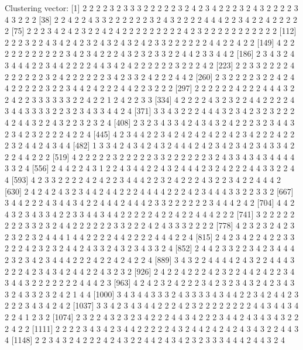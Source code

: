 \begin{Schunk}
\begin{Soutput}
Clustering vector:
   [1] 2 2 2 2 3 2 3 3 3 2 2 2 2 2 3 2 4 2 3 4 2 2 2 3 2 4 3 2 2 2 2 3 4 3 2 2 2
  [38] 2 2 4 2 2 4 3 3 2 2 2 2 2 2 3 2 4 3 2 2 2 2 4 4 4 2 2 3 4 2 2 4 2 2 2 2 2
  [75] 2 2 2 3 4 2 4 2 3 2 2 4 2 4 2 2 2 2 2 2 2 2 2 4 2 3 2 2 2 2 2 2 2 2 2 2 2
 [112] 2 2 2 3 2 2 4 3 4 2 4 2 3 2 4 3 2 4 3 2 4 2 3 3 2 2 2 2 2 2 4 4 2 2 4 2 2
 [149] 4 2 2 2 2 2 2 2 2 2 2 2 3 4 2 3 4 2 2 2 4 3 2 3 2 3 3 2 2 4 4 2 3 3 4 4 2
 [186] 2 3 4 3 2 4 3 4 4 4 2 2 3 4 4 2 2 2 2 4 4 3 4 2 4 2 2 2 2 2 2 3 2 2 2 4 2
 [223] 2 2 3 3 2 2 2 2 4 2 2 2 2 2 2 3 2 4 2 2 2 2 2 2 3 4 2 3 3 2 4 2 2 2 4 4 2
 [260] 2 3 2 2 2 2 3 2 2 4 2 4 4 2 2 2 2 2 3 2 2 3 4 4 2 4 2 2 2 4 4 2 2 3 2 2 2
 [297] 2 2 2 2 2 2 4 2 2 2 4 4 4 3 2 2 4 2 2 3 3 3 3 3 3 2 2 4 2 2 1 2 4 2 2 3 3
 [334] 4 2 2 2 2 4 3 2 3 2 2 4 4 2 2 2 2 4 3 4 4 3 3 3 3 2 2 3 2 3 4 3 3 4 4 2 4
 [371] 3 3 4 3 2 2 2 4 4 4 3 2 3 4 2 3 2 3 2 2 2 4 2 4 4 3 2 2 4 3 2 2 3 2 3 2 4
 [408] 2 3 2 3 4 3 3 4 2 4 3 4 3 2 4 2 2 2 3 2 3 4 4 3 2 3 4 2 3 2 2 2 2 4 2 2 4
 [445] 4 2 3 4 4 2 2 3 4 2 4 2 4 2 4 2 2 4 2 3 4 2 2 2 4 2 2 2 3 2 4 4 2 4 3 4 4
 [482] 1 3 3 4 2 4 3 4 2 4 3 2 4 4 4 2 4 2 3 4 2 3 4 2 3 4 3 3 4 2 2 2 4 4 2 2 2
 [519] 4 2 2 2 2 2 3 2 2 2 2 2 3 3 2 2 2 2 2 2 3 2 4 3 3 4 3 4 3 4 4 4 4 3 3 2 4
 [556] 2 4 4 2 2 4 3 1 2 2 4 3 4 4 2 2 4 3 2 4 4 4 2 3 2 4 2 2 2 4 4 3 3 2 2 4 4
 [593] 4 2 3 3 2 2 2 2 4 2 4 2 2 3 4 4 4 2 2 3 2 4 2 2 2 4 3 2 2 3 4 2 2 4 4 4 2
 [630] 2 4 2 4 2 4 3 2 3 4 4 2 4 4 2 2 2 4 4 4 4 2 2 2 4 2 3 4 4 4 3 3 2 2 3 3 2
 [667] 3 4 4 2 2 2 4 3 4 4 3 4 2 2 4 4 4 2 4 4 4 2 3 3 2 2 2 2 2 2 3 4 4 4 2 4 2
 [704] 4 4 2 4 3 2 3 4 3 3 4 2 2 3 3 4 4 3 4 4 2 2 2 2 2 4 2 2 4 2 2 4 4 4 2 2 2
 [741] 3 2 2 2 2 2 2 2 2 3 3 2 3 2 4 4 2 2 2 2 2 2 3 3 2 2 2 4 2 4 3 3 3 2 2 2 2
 [778] 4 2 3 2 3 2 4 2 3 2 3 2 2 3 2 4 4 4 1 4 4 2 2 2 2 4 4 2 2 2 2 4 4 4 2 2 4
 [815] 2 4 2 3 4 2 2 4 2 2 3 3 2 2 2 4 2 3 2 3 2 4 4 2 4 3 3 2 4 3 2 3 4 3 3 2 4
 [852] 2 4 4 2 3 3 2 2 3 4 2 3 4 4 4 2 3 2 3 4 2 3 4 4 4 2 2 2 4 2 2 4 2 4 2 2 4
 [889] 3 4 3 2 2 4 4 4 4 2 4 3 2 2 4 4 4 3 2 2 2 4 2 3 4 3 4 2 4 4 2 2 4 3 2 3 2
 [926] 2 4 2 2 4 2 2 2 4 2 3 2 2 4 4 2 4 2 2 3 4 3 4 4 3 2 2 2 2 2 2 2 4 4 4 2 3
 [963] 4 2 4 2 3 2 4 2 2 2 3 4 2 3 2 3 4 3 2 4 2 3 4 3 3 2 4 3 3 2 3 2 4 2 1 4 4
[1000] 3 4 3 4 4 3 3 3 2 4 3 3 3 3 4 3 4 4 2 2 3 4 2 4 4 2 3 2 2 2 3 4 3 4 2 4 2
[1037] 3 3 4 2 3 4 3 4 4 2 2 2 4 2 3 2 2 2 2 2 2 2 2 4 4 3 4 4 3 4 2 2 4 1 2 3 2
[1074] 2 3 2 2 4 3 2 3 2 3 4 2 2 2 4 4 3 4 2 2 2 3 4 4 2 4 3 4 3 4 3 2 2 2 4 2 2
[1111] 2 2 2 2 3 4 3 4 2 3 4 4 2 2 2 2 2 4 3 2 4 4 2 4 2 4 2 4 3 4 3 2 2 4 4 3 4
[1148] 2 2 3 4 3 2 4 2 2 2 4 2 4 3 2 2 4 4 2 4 3 4 2 3 2 3 3 3 4 4 4 2 4 4 3 2 4

\end{Soutput}
\end{Schunk}

